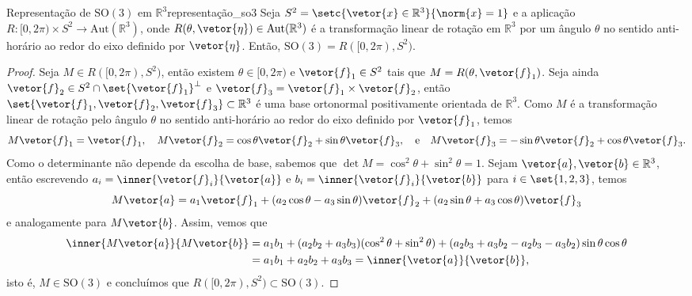 \begin{proposition}{Representação de \(\mathrm{SO}(3)\) em \(\mathbb{R}^3\)}{representação_so3}
    Seja \(S^2 = \setc{\vetor{x} \in \mathbb{R}^3}{\norm{x} = 1}\) e a aplicação \(R : [0,2\pi) \times S^2 \to \mathrm{Aut}(\mathbb{R}^3)\), onde \(R(\theta, \vetor{\eta}) \in \mathrm{Aut}(\mathbb{R}^3)\) é a transformação linear de rotação em \(\mathbb{R}^3\) por um ângulo \(\theta\) no sentido anti-horário ao redor do eixo definido por \(\vetor{\eta}\). Então, \(\mathrm{SO}(3) = R([0,2\pi), S^2)\).
\end{proposition}
\begin{proof}
    Seja \(M \in R([0,2\pi), S^2)\), então existem \(\theta \in [0,2\pi)\) e \(\vetor{f}_1 \in S^2\) tais que \(M = R(\theta, \vetor{f}_1)\). Seja ainda \(\vetor{f}_2 \in S^2 \cap \set{\vetor{f}_1}^\perp\) e \(\vetor{f}_3 = \vetor{f}_1 \times \vetor{f}_2\), então \(\set{\vetor{f}_1, \vetor{f}_2, \vetor{f}_3} \subset \mathbb{R}^3\) é uma base ortonormal positivamente orientada de \(\mathbb{R}^3\). Como \(M\) é a transformação linear de rotação pelo ângulo \(\theta\) no sentido anti-horário ao redor do eixo definido por \(\vetor{f}_1\), temos
    \begin{equation*}
        M\vetor{f}_1 = \vetor{f}_1,
        \quad
        M\vetor{f}_2 = \cos\theta \vetor{f}_2 + \sin\theta \vetor{f}_3,
        \quad \text{e}\quad
        M\vetor{f}_3 = -\sin\theta \vetor{f}_2 + \cos\theta \vetor{f}_3.
    \end{equation*}
    Como o determinante não depende da escolha de base, sabemos que \(\det{M} = \cos^2\theta + \sin^2 \theta = 1\). Sejam \(\vetor{a}, \vetor{b} \in \mathbb{R}^3\), então escrevendo \(a_i = \inner{\vetor{f}_i}{\vetor{a}}\) e \(b_i = \inner{\vetor{f}_i}{\vetor{b}}\) para \(i \in \set{1,2,3}\), temos
    \begin{equation*}
        M\vetor{a} = a_1 \vetor{f}_1 + (a_2 \cos\theta - a_3 \sin\theta)\vetor{f}_2 + (a_2 \sin\theta + a_3 \cos\theta)\vetor{f}_3
    \end{equation*}
    e analogamente para \(M\vetor{b}\). Assim, vemos que
    \begin{align*}
        \inner{M\vetor{a}}{M\vetor{b}}  &= a_1 b_1 + (a_2b_2 + a_3 b_3)(\cos^2\theta + \sin^2\theta) + (a_2b_3 + a_3b_2 - a_2b_3 - a_3 b_2)\sin\theta\cos\theta\\
                                        &= a_1 b_1 + a_2 b_2 + a_3 b_3 = \inner{\vetor{a}}{\vetor{b}},
    \end{align*}
    isto é, \(M \in \mathrm{SO}(3)\) e concluímos que \(R([0,2\pi), S^2) \subset \mathrm{SO}(3)\).


\end{proof}
